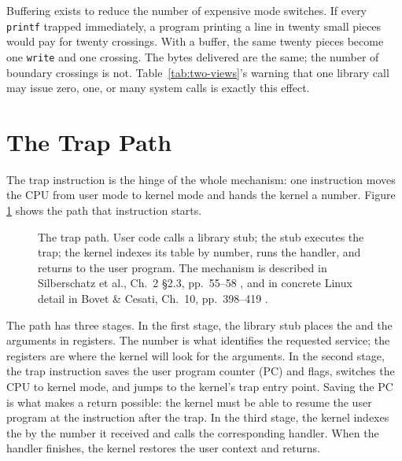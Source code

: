 \documentclass[11pt]{article}
\begin{document}
Buffering exists to reduce the number of expensive mode switches. If every
\texttt{printf} trapped immediately, a program printing a line in twenty small
pieces would pay for twenty crossings. With a buffer, the same twenty pieces
become one \texttt{write} and one crossing. The bytes delivered are the same;
the number of boundary crossings is not. Table~\ref{tab:two-views}'s warning
that one library call may issue zero, one, or many system calls is exactly this
effect.

\clearpage
\section{The Trap Path}

\noindent{}

The trap instruction is the hinge of the whole mechanism: one instruction moves
the CPU from user mode to kernel mode and hands the kernel a number. Figure
\ref{fig:trap-path} shows the path that instruction starts.

\begin{figure}[h]
\centering
{}
\caption{The trap path. User code calls a library stub; the stub executes the
trap; the kernel indexes its table by number, runs the handler, and returns to
the user program. The mechanism is described in Silberschatz et al., Ch.~2
\S2.3, pp.~55--58 \cite{SilberschatzOSC_operating_system_concepts}, and in
concrete Linux detail in Bovet \& Cesati, Ch.~10, pp.~398--419
\cite{BovetCesati_understanding_linux_kernel}.}
\label{fig:trap-path}
\end{figure}

The path has three stages. In the first stage, the library stub places the
 and the arguments in registers. The number is what
identifies the requested service; the registers are where the kernel will look
for the arguments. In the second stage, the trap instruction saves the user
program counter (PC) and flags, switches the CPU to kernel mode, and jumps to
the kernel's trap entry point. Saving the PC is what makes a return possible:
the kernel must be able to resume the user program at the instruction after the
trap. In the third stage, the kernel indexes the  by the
number it received and calls the corresponding handler. When the handler
finishes, the kernel restores the user context and returns.
\end{document}
